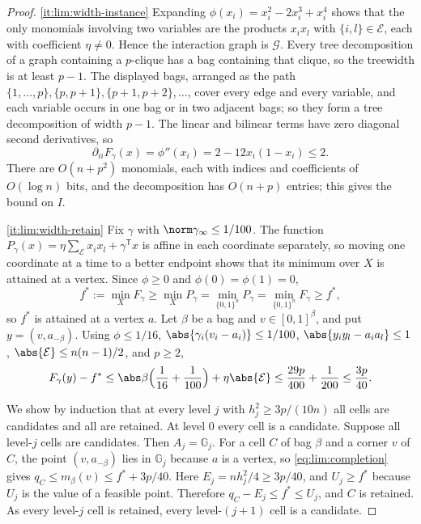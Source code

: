 \begin{proof}
\ref{it:lim:width-instance}
Expanding $\phi(x_i)=x_i^2-2x_i^3+x_i^4$ shows that the only monomials
involving two variables are the products $x_ix_l$ with $\{i,l\}\in\mathcal E$,
each with coefficient $\eta\ne0$. Hence the interaction graph is $\mathcal
G$. Every tree decomposition of a graph containing a $p$-clique has a bag
containing that clique, so the treewidth is at least $p-1$. The displayed
bags, arranged as the path $\{1,\ldots,p\},\{p,p+1\},\{p+1,p+2\},\ldots$,
cover every edge and every variable, and each variable occurs in one bag or
in two adjacent bags; so they form a tree decomposition of width $p-1$. The
linear and bilinear terms have zero diagonal second derivatives, so
\[
 \partial_{ii}F_\gamma(x)=\phi''(x_i)=2-12x_i(1-x_i)\le2 .
\]
There are $O(n+p^2)$ monomials, each with indices and coefficients of
$O(\log n)$ bits, and the decomposition has $O(n+p)$ entries; this gives the
bound on $I$.

\ref{it:lim:width-retain}
Fix $\gamma$ with $\norm\gamma_\infty\le1/100$. The function
$P_\gamma(x)=\eta\sum_{\mathcal E}x_ix_l+\gamma^{\mathsf T}x$ is affine in
each coordinate separately, so moving one coordinate at a time to a better
endpoint shows that its minimum over $X$ is attained at a vertex. Since
$\phi\ge0$ and $\phi(0)=\phi(1)=0$,
\[
 f^*:=\min_XF_\gamma\ge\min_XP_\gamma=\min_{\{0,1\}^n}P_\gamma
 =\min_{\{0,1\}^n}F_\gamma\ge f^*,
\]
so $f^*$ is attained at a vertex $a$. Let $\beta$ be a bag and
$v\in[0,1]^\beta$, and put $y=(v,a_{-\beta})$. Using $\phi\le1/16$,
$\abs{\gamma_i(v_i-a_i)}\le1/100$, $\abs{y_iy_l-a_ia_l}\le1$,
$\abs{\mathcal E}\le n(n-1)/2$, and $p\ge2$,
\begin{equation}\label{eq:lim:completion}
 F_\gamma(y)-f^*
 \le\abs\beta\Bigl(\frac1{16}+\frac1{100}\Bigr)+\eta\abs{\mathcal E}
 \le\frac{29p}{400}+\frac1{200}\le\frac{3p}{40}.
\end{equation}

We show by induction that at every level $j$ with $h_j^2\ge3p/(10n)$ all
cells are candidates and all are retained. At level $0$ every cell is a
candidate. Suppose all level-$j$ cells are candidates. Then $A_j=\mathbb
G_j$. For a cell $C$ of bag $\beta$ and a corner $v$ of $C$, the point
$(v,a_{-\beta})$ lies in $\mathbb G_j$ because $a$ is a vertex, so
\eqref{eq:lim:completion} gives $q_C\le m_\beta(v)\le f^*+3p/40$. Here
$E_j=nh_j^2/4\ge3p/40$, and $U_j\ge f^*$ because $U_j$ is the value of a
feasible point. Therefore $q_C-E_j\le f^*\le U_j$, and $C$ is retained. As
every level-$j$ cell is retained, every level-$(j+1)$ cell is a candidate.


\end{proof}
